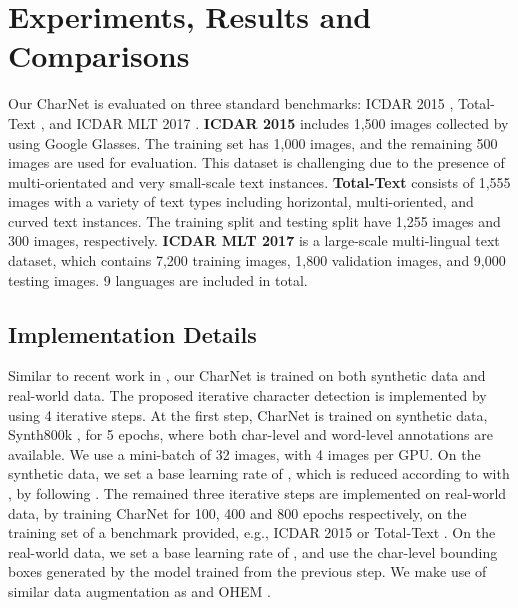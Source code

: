 \documentclass[10pt,twocolumn,letterpaper]{article}
\begin{document}
\section{Experiments, Results and Comparisons}
Our CharNet is evaluated on  three standard benchmarks: ICDAR 2015 \cite{karatzas2015icdar}, Total-Text \cite{ch2017total}, and ICDAR MLT 2017 \cite{nayef2017icdar2017}.
\textbf{ICDAR 2015} includes 1,500 images collected by using Google Glasses. The training set has 1,000 images, and the remaining 500 images are used for evaluation. This dataset is challenging due to the presence of multi-orientated and very small-scale text instances.
\textbf{Total-Text} consists of 1,555 images with a variety of text types including horizontal, multi-oriented, and curved text instances. The training split and testing split have 1,255 images and 300 images, respectively.
\textbf{ICDAR MLT 2017} is a large-scale multi-lingual text dataset, which contains 7,200 training images, 1,800 validation images, and 9,000 testing images. 9 languages are included in total.

\subsection{Implementation Details}
Similar to recent work in \cite{he2018end, liu2018fots}, our CharNet is trained on both synthetic data and real-world data. The proposed iterative character detection is implemented by using 4 iterative steps. At the first step, CharNet is trained on synthetic data, Synth800k \cite{gupta2016synthetic}, for 5 epochs, where both char-level and word-level annotations are available. We use a mini-batch of 32 images, with 4 images per GPU. On the synthetic data, we set a base learning rate of , which is reduced according to  with , by following \cite{chen2018deeplab}. The remained three iterative steps are implemented on real-world data, by training CharNet for 100, 400 and 800 epochs respectively, on the training set of a benchmark provided, e.g., ICDAR 2015 \cite{karatzas2015icdar} or Total-Text \cite{ch2017total}. On the real-world data, we set a base learning rate of , and use the char-level bounding boxes generated by the model trained from the previous step. We make use of similar data augmentation as \cite{liu2018fots} and OHEM \cite{shrivastava2016training}.
\end{document}
